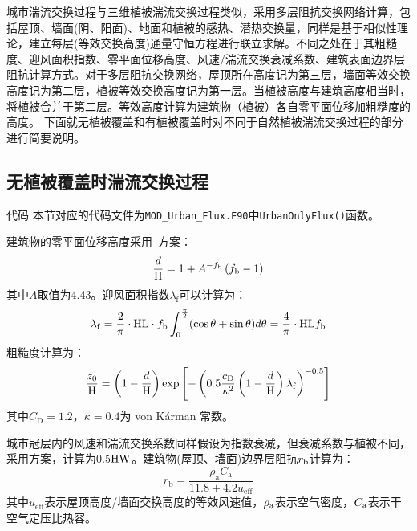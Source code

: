 城市湍流交换过程与三维植被湍流交换过程类似，采用多层阻抗交换网络计算，包括屋顶、墙面(阴、阳面)、地面和植被的感热、潜热交换量，同样是基于相似性理论，建立每层(等效交换高度)通量守恒方程进行联立求解。不同之处在于其粗糙度、迎风面积指数、零平面位移高度、风速/湍流交换衰减系数、建筑表面边界层阻抗计算方式。对于多层阻抗交换网络，屋顶所在高度记为第三层，墙面等效交换高度记为第二层，植被等效交换高度记为第一层。当植被高度与建筑高度相当时，将植被合并于第二层。等效高度计算为建筑物（植被）各自零平面位移加粗糙度的高度。
下面就无植被覆盖和有植被覆盖时对不同于自然植被湍流交换过程的部分进行简要说明。

\subsection{无植被覆盖时湍流交换过程}\label{无植被覆盖时湍流交换过程}
\begin{mymdframed}{代码}
  本节对应的代码文件为\texttt{MOD\_Urban\_Flux.F90}中\texttt{UrbanOnlyFlux()}函数。
\end{mymdframed}

建筑物的零平面位移高度采用~\citet{macdonald1998improved}方案：
\begin{equation}
  \frac{d}{\rm H}=1+A^{-f_{\mathrm{b}}}\left(f_{\mathrm{b}}-1\right)
\end{equation}
其中$A$取值为4.43。迎风面积指数$\lambda_{\mathrm{f}}$可以计算为：
\begin{equation}
  \lambda_{\mathrm{f}}=\frac{2}{\pi} \cdot {\rm HL} \cdot f_{\mathrm{b}} \int_{\mathrm{0}}^{\frac{\pi}{2}}(\cos \theta+\sin \theta) d \theta=\frac{4}{\pi} \cdot {\rm HL} f_{\mathrm{b}}
\end{equation}
粗糙度计算为：
\begin{equation}
  \frac{z_{0}}{\rm H}=\left(1-\frac{d}{\rm H}\right) \exp \left[-\left(0.5 \frac{c_{\mathrm{D}}}{\kappa^{2}}\left(1-\frac{d}{\rm H}\right) \lambda_{\mathrm{f}}\right)^{-0.5}\right]
\end{equation}
其中$C_{\mathrm {D}}=1.2$，$\kappa=0.4$为 von K\'arman 常数。

城市冠层内的风速和湍流交换系数同样假设为指数衰减，但衰减系数与植被不同，
采用\citet{masson2000physically}方案，计算为0.5${\rm HW}$。建筑物(屋顶、墙面)边界层阻抗$r_{\rm b}$计算为\citep{oleson2008urban}：
\begin{equation}
  r_{\mathrm{b}}=\frac{\rho_{\mathrm{a}} C_{\mathrm{a}}}{11.8+4.2 u_{\mathrm{e f f}}}
\end{equation}
其中$u_{\mathrm{eff}}$表示屋顶高度/墙面交换高度的等效风速值，$\rho_{\rm a}$表示空气密度，$C_{\rm a}$表示干空气定压比热容。

